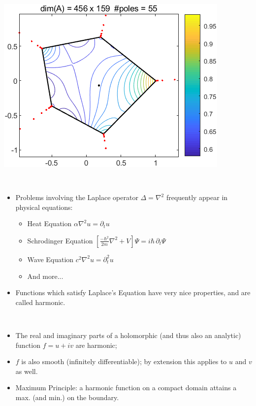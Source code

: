 \documentclass{seminar}
\begin{document}
\begin{slide}
\begin{multicols}{3}
\includegraphics[scale=.4]{./PNG/randpoly1}
\end{multicols}
\end{slide} %




\begin{slide} %
{} \small \\

\begin{itemize}
	\item Problems involving the Laplace operator $\Delta={\nabla}^2$ frequently appear in physical equations:
	\begin{itemize}
		\item Heat Equation
		$\alpha {\nabla}^2 u={\partial}_t u$
		\item Schrodinger Equation
		$\left[ \frac{-{\hbar}^2}{2m}{\nabla}^2 + V \right]\Psi=i \hbar \, \partial_t \Psi$
		\item Wave Equation
		$c^2 {\nabla}^2 u={\partial}_t^2 u$
		\item And more...
	\end{itemize}
	\item Functions which satisfy Laplace's Equation have very nice properties, and are called harmonic.
	
\end{itemize}
\end{slide} %




\begin{slide} %
{} \small \\

\begin{itemize}
	\item The real and imaginary parts of a holomorphic (and thus also an analytic) function $f=u+iv$ are harmonic;
	\item $f$ is also smooth (infinitely differentiable); by extension this applies to $u$ and $v$ as well.
	\item Maximum Principle: a harmonic function on a compact domain attains a max. (and min.) on the boundary.
\end{itemize}
\end{slide} %
\end{document}
